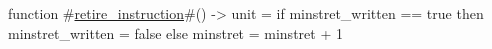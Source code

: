 function #\hyperref[sailRISCVzretirezyinstruction]{retire\_instruction}#() -> unit = {
  if   minstret_written == true
  then minstret_written = false
  else minstret = minstret + 1
}
